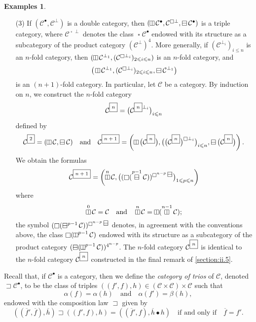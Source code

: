 \documentclass[a4paper,fleqn]{article}
\theoremstyle{plain}
\theoremstyle{definition}
\newtheorem*{examples}{Examples}
\renewcommand{\leq}{\leqslant}
\newcommand{\oldpage}[1]{{\marginpar{\footnotesize$\bigg\vert$\,\,\,\,\textit{p.~#1}}}}
\newcommand{\textand}{\quad\text{and}\quad}
\newcommand{\CC}{\mathcal{C}}
\newcommand{\boxnum}[1]{{\fbox{\scriptsize${#1}$\vphantom{$jk$}}}}
\newcommand{\hsqbox}{{\boxminus}}
\newcommand{\vsqbox}{{\rotatebox{90}{$\boxminus$}}}
\DeclareMathOperator{\sq}{\square}
\DeclareMathOperator{\hsq}{\raisebox{-.05em}{$\hsqbox$}}
\DeclareMathOperator{\vsq}{\raisebox{-.1em}{$\vsqbox$}}
\DeclareMathOperator{\trio}{\sqsupset}
\newcommand{\smallbullet}{\bullet}
\begin{document}
\begin{examples}
\begin{enumerate}
    \item[\normalfont(3)]
      If $(\CC^\smallbullet,\CC^\perp)$ is a double category, then $(\vsq\CC^\smallbullet,\CC^{\sq\perp},\hsq\CC^\smallbullet)$ is a triple category, where $\CC^{\sq\perp}$ denotes the class $\sq\CC^\smallbullet$ endowed with its structure as a subcategory of the product category $(\CC^\perp)^4$.
      \oldpage{423}
      More generally, if $(\CC^{\perp_i})_{i\leq n}$ is an $n$-fold category, then $(\vsq\CC^{\perp_1},(\CC^{\sq\perp_i})_{2\leq i\leq n})$ is an $n$-fold category, and
      \[
        \big(
          \vsq\CC^{\perp_1},
          (\CC^{\sq\perp_i})_{2\leq i\leq n},
          \hsq\CC^{\perp_1}
        \big)
      \]
      is an $(n+1)$-fold category.
      In particular, let $\CC$ be a category.
      By induction on  $n$, we construct the $n$-fold category
      \[
        \CC^\boxnum{n}
        = \big(\CC^{\boxnum{n}\perp_i}\big)_{i\leq n}
      \]
      defined by
      \[
        \CC^\boxnum{2} = (\vsq\CC,\hsq\CC)
        \textand
        \CC^\boxnum{n+1} = \left(
          \vsq\big(\CC^\boxnum{n}\big),
          \big(\big(\CC^\boxnum{n}\big)^{\sq\perp_i}\big)_{i\leq n},
          \hsq\big(\CC^\boxnum{n}\big)
        \right).
      \]
      We obtain the formulas
      \[
        \CC^\boxnum{n+1}
        = \left(
          \vsq^n\CC,
          \big((\sq(\hsq^{p-1}\CC))^{\sq^{n-p}\hsq}\big)_{1\leq p\leq n}
        \right)
      \]
      where
      \[
        \vsq^0\CC = \CC
        \textand
        \vsq^n\CC = \vsq(\vsq^{n-1}\CC);
      \]
      the symbol $(\sq(\hsq^{p-1}\CC))^{\sq^{n-p}\hsq}$ denotes, in agreement with the conventions above, the class $\sq(\vsq^{p-1}\CC)$ endowed with its structure as a subcategory of the product category $(\hsq(\vsq^{p-1}\CC))^{4^{n-p}}$.
      The $n$-fold category $\CC^\boxnum{n}$ is identical to the $n$-fold category $\CC^\boxnum{n}$ constructed in the final remark of \cref{section:ii.5}.
  \end{enumerate}
\end{examples}

Recall that, if $\CC^\smallbullet$ is a category, then we define the \emph{category of trios} of $\CC$, denoted $\trio\CC^\smallbullet$, to be the class of triples $((f',f),h)\in(\CC\times\CC)\times\CC$ such that
\[
  \alpha(f)=\alpha(h)
  \textand
  \alpha(f')=\beta(h),
\]
endowed with the composition law $\sqsupset$ given by
\[
  ((\overline{f}',\overline{f}),\overline{h}) \sqsupset ((f',f),h)
  = ((\overline{f}',f),\overline{h}\smallbullet h)
  \quad\text{if and only if}\quad
  \overline{f}=f'.
\]
\end{document}
